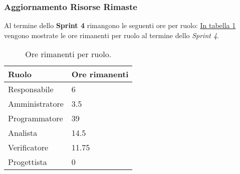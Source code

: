 \subsubsection{Aggiornamento Risorse Rimaste}
\label{sec:AggiornamentoRisorse_Sprint4}
Al termine dello \textbf{Sprint 4} rimangono le seguenti ore per ruolo: \hyperref[tab:sprint4_ore_rimanenti]{In tabella \ref{tab:sprint4_ore_rimanenti}} vengono mostrate le ore rimanenti per ruolo al termine dello \textit{Sprint 4}.

\begin{table}[H]
    \centering
    \begin{tabular}{| l | l |}
    \hline
    \textbf{Ruolo} & 
    \textbf{Ore rimanenti}\\
    \hline
        Responsabile & 6 \\
    \hline
        Amministratore & 3.5 \\
    \hline
        Programmatore & 39\\
    \hline
        Analista & 14.5\\
    \hline
        Verificatore & 11.75\\
    \hline
        Progettista & 0\\
    \hline
    \end{tabular}
    \caption{Ore rimanenti per ruolo.}
    \label{tab:sprint4_ore_rimanenti} 
\end{table}